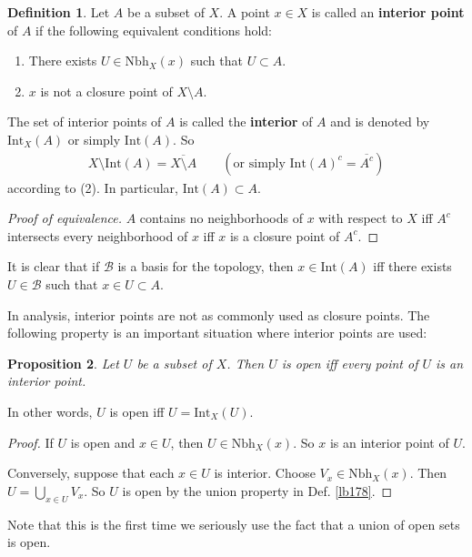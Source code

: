 \documentclass[12pt,b5paper,notitlepage]{article}
\theoremstyle{definition}
\newtheorem{df}{Definition}[section]
\theoremstyle{plain}
\newtheorem{pp}[df]{Proposition}
\newcommand{\mc}{\mathcal}
\newcommand{\ovl}{\overline}
\newcommand{\Int}{\mathrm{Int}}
\newcommand{\Nbh}{\mathrm{Nbh}}
\numberwithin{equation}{section}
\begin{document}
\begin{df}\label{lb187}
Let $A$ be a subset of $X$. A point $x\in X$ is called an \textbf{interior point}  of $A$ if the following equivalent conditions hold:
\begin{enumerate}[label=(\arabic*)]
\item There exists $U\in \Nbh_X(x)$ such that $U\subset A$.
\item $x$ is not a closure point of $X\setminus A$. 
\end{enumerate}
The set of interior points of $A$ is called the \textbf{interior}  of $A$ and is denoted by $\Int_X(A)$ or simply $\Int(A)$. \index{Int@$\Int_X(A)=\Int(A)$} So
\begin{align}
X\setminus\Int(A)=\ovl{X\setminus A}\qquad(\text{or simply }\Int(A)^c=\ovl{A^c})
\end{align}
according to (2). In particular, $\Int(A)\subset A$.
\end{df}

\begin{proof}[Proof of equivalence]
$A$ contains no neighborhoods of $x$ with respect to $X$ iff $A^c$ intersects every neighborhood of $x$ iff $x$ is a closure point of $A^c$.
\end{proof}

It is clear that if $\mc B$ is a basis for the topology, then $x\in\Int(A)$ iff there exists $U\in\mc B$ such that $x\in U\subset A$.

In analysis, interior points are not as commonly used as closure points. The following property is an important situation where interior points are used:

\begin{pp}\label{lb179}
Let $U$ be a subset of $X$. Then $U$ is open iff every point of $U$ is an interior point.
\end{pp}

In other words, $U$ is open iff $U=\Int_X(U)$.

\begin{proof}
If $U$ is open and $x\in U$, then $U\in \Nbh_X(x)$. So $x$ is an interior point of $U$.

Conversely, suppose that each $x\in U$ is interior. Choose $V_x\in\Nbh_X(x)$. Then $U=\bigcup_{x\in U}V_x$. So $U$ is open by the union property in Def. \ref{lb178}.
\end{proof}

Note that this is the first time we seriously use the fact that a union of open sets is open. 
\end{document}
